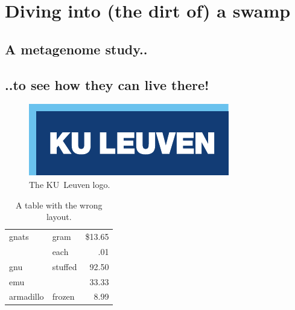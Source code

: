 \chapter{Diving into (the dirt of) a swamp}
\label{cha:5}

\section{A metagenome study..}


\section{..to see how they can live there! }



\begin{figure}
  \centering
  \includegraphics{figures/logokul}
  \caption{The KU~Leuven logo.}
  \label{fig:logo}
\end{figure}






\begin{table}
  \centering
  \begin{tabular}{||l|lr||} \hline
    gnats     & gram      & \$13.65 \\ \cline{2-3}
              & each      & .01 \\ \hline
    gnu       & stuffed   & 92.50 \\ \cline{1-1} \cline{3-3}
    emu       &           & 33.33 \\ \hline
    armadillo & frozen    & 8.99 \\ \hline
  \end{tabular}
  \caption{A table with the wrong layout.}
  \label{tab:wrong}
\end{table}




